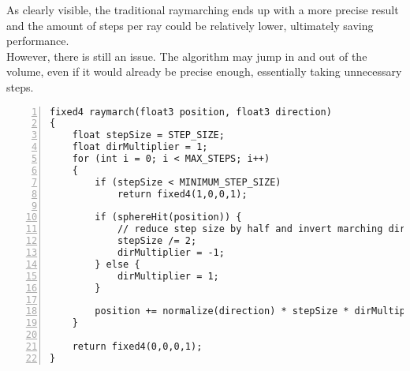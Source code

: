 \begin{figure}[H]
    \centering
\end{figure}

\noindent
As clearly visible, the traditional \gls{raymarching} ends up with a more precise result and the amount of steps per ray could be relatively lower, ultimately saving performance. 
\\
However, there is still an issue. The algorithm may jump in and out of the volume, even if it would already be precise enough, essentially taking unnecessary steps.

\begin{lstlisting}[language=HLSL, numbers=left, caption=Implementation of a traditional ray march function with converging surface distance approximation.,captionpos=b, label=lst:shader:raymarch:traditional]
fixed4 raymarch(float3 position, float3 direction)
{
    float stepSize = STEP_SIZE;
    float dirMultiplier = 1;
    for (int i = 0; i < MAX_STEPS; i++)
    {
        if (stepSize < MINIMUM_STEP_SIZE)
            return fixed4(1,0,0,1);

        if (sphereHit(position)) {
            // reduce step size by half and invert marching direction.
            stepSize /= 2;
            dirMultiplier = -1;
        } else {
            dirMultiplier = 1;
        }
        
        position += normalize(direction) * stepSize * dirMultiplier;
    }
    
    return fixed4(0,0,0,1);
}
\end{lstlisting}

